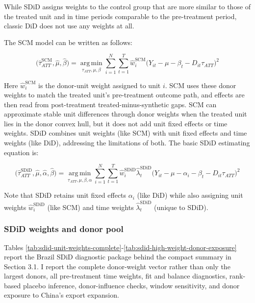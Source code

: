 \documentclass[
  12pt,
]{article}
\begin{document}
While SDiD assigns weights to the control group that are more similar to those of the treated unit and in time periods comparable to the pre-treatment period, classic DiD does not use any weights at all.

The SCM model can be written as follows:

\[
\bigl(\hat{\tau}_{ATT}^{\text{SCM}}, \hat{\mu}, \hat{\beta}\bigr)
=
\operatorname*{arg\,min}_{\tau_{ATT}, \mu, \beta}
\sum_{i=1}^{N}\sum_{t=1}^{T}
\hat{w}^{\text{SCM}}_i
\bigl(Y_{it}-\mu-\beta_t-D_{it}\tau_{ATT}\bigr)^2
\]

Here \(\hat{w}^{\text{SCM}}_i\) is the donor-unit weight assigned to unit \(i\). SCM uses these donor weights to match the treated unit's pre-treatment outcome path, and effects are then read from post-treatment treated-minus-synthetic gaps. SCM can approximate stable unit differences through donor weights when the treated unit lies in the donor convex hull, but it does not add unit fixed effects or time weights. SDiD combines unit weights (like SCM) with unit fixed effects and time weights (like DiD), addressing the limitations of both. The basic SDiD estimating equation is:

\[
\bigl(\hat{\tau}_{ATT}^{\text{SDiD}}, \hat{\mu}, \hat{\alpha}, \hat{\beta} \bigr)
=
\operatorname*{arg\,min}_{\tau_{ATT},\mu,\beta, \alpha}
\sum_{i=1}^{N}\sum_{t=1}^{T}
\hat{w}^{\text{SDiD}}_i \hat{\lambda}^{\text{SDiD}}_t
\bigl(Y_{it}- \mu- \alpha_i - \beta_t-D_{it}\tau_{ATT}\bigr)^2
\]

Note that SDiD retains unit fixed effects \(\alpha_i\) (like DiD) while also assigning unit weights \(\hat{w}^{\text{SDiD}}_i\) (like SCM) and time weights \(\hat{\lambda}^{\text{SDiD}}_t\) (unique to SDiD).

\subsubsection{SDiD weights and donor pool}\label{sdid-weights-and-donor-pool}

Tables \ref{tab:sdid-unit-weights-complete}-\ref{tab:sdid-high-weight-donor-exposure} report the Brazil SDiD diagnostic package behind the compact summary in Section 3.1. I report the complete donor-weight vector rather than only the largest donors, all pre-treatment time weights, fit and balance diagnostics, rank-based placebo inference, donor-influence checks, window sensitivity, and donor exposure to China's export expansion.

\begingroup\fontsize{7}{9}\selectfont
\end{document}
